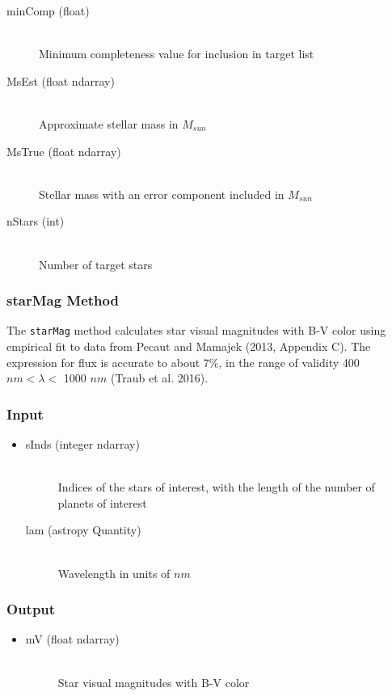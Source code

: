 \documentclass[cleanfoot]{asme2ej}
\begin{document}
\begin{itemize}
\begin{description}
    \item[minComp (float)] \hfill \\ Minimum completeness value for inclusion in target list
    \item[MsEst (float ndarray)] \hfill \\ Approximate stellar mass in $ M_{sun} $
    \item[MsTrue (float ndarray)] \hfill \\ Stellar mass with an error component included in $ M_{sun} $
    \item[nStars (int)] \hfill \\ Number of target stars
\end{description}
\end{itemize}

\subsubsection{starMag Method} \label{sec:starMagtask}
The \verb+starMag+ method calculates star visual magnitudes with B-V color using empirical fit to data from Pecaut and Mamajek (2013, Appendix C). The expression for flux is accurate to about $7\%$, in the range of validity 400 $ nm < \lambda < $ 1000 $ nm $ (Traub et al. 2016).

\subsubsection*{Input}
\begin{itemize}
\item 
\begin{description}
    \item[sInds (integer ndarray)] \hfill \\ Indices of the stars of interest, with the length of the number 
        of planets of interest
    \item[lam (astropy Quantity)] \hfill \\ Wavelength in units of $ nm $
\end{description}
\end{itemize}

\subsubsection*{Output}
\begin{itemize}
\item
\begin{description}
    \item[mV (float ndarray)] \hfill \\ Star visual magnitudes with B-V color
\end{description}
\end{itemize}
\end{document}
